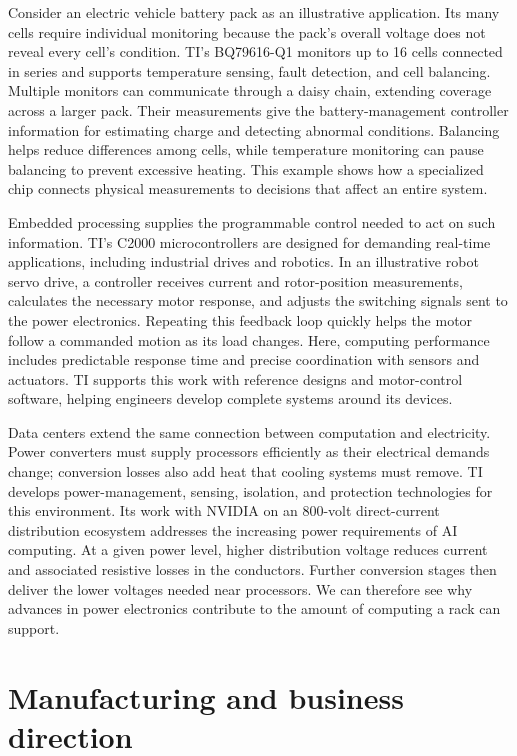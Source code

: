 \documentclass[10pt]{article}
\begin{document}
Consider an electric vehicle battery pack as an illustrative application. Its many cells require individual monitoring because the pack's overall voltage does not reveal every cell's condition. TI's BQ79616-Q1 monitors up to 16 cells connected in series and supports temperature sensing, fault detection, and cell balancing. Multiple monitors can communicate through a daisy chain, extending coverage across a larger pack. Their measurements give the battery-management controller information for estimating charge and detecting abnormal conditions. Balancing helps reduce differences among cells, while temperature monitoring can pause balancing to prevent excessive heating. This example shows how a specialized chip connects physical measurements to decisions that affect an entire system.~\cite{ti-battery}

Embedded processing supplies the programmable control needed to act on such information. TI's C2000 microcontrollers are designed for demanding real-time applications, including industrial drives and robotics. In an illustrative robot servo drive, a controller receives current and rotor-position measurements, calculates the necessary motor response, and adjusts the switching signals sent to the power electronics. Repeating this feedback loop quickly helps the motor follow a commanded motion as its load changes. Here, computing performance includes predictable response time and precise coordination with sensors and actuators. TI supports this work with reference designs and motor-control software, helping engineers develop complete systems around its devices.~\cite{ti-motor}

Data centers extend the same connection between computation and electricity. Power converters must supply processors efficiently as their electrical demands change; conversion losses also add heat that cooling systems must remove. TI develops power-management, sensing, isolation, and protection technologies for this environment. Its work with NVIDIA on an 800-volt direct-current distribution ecosystem addresses the increasing power requirements of AI computing. At a given power level, higher distribution voltage reduces current and associated resistive losses in the conductors. Further conversion stages then deliver the lower voltages needed near processors. We can therefore see why advances in power electronics contribute to the amount of computing a rack can support.~\cite{ti-power}

\section*{Manufacturing and business direction}
\end{document}
